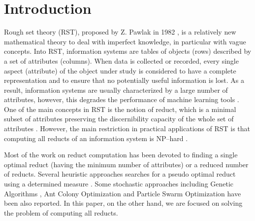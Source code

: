 \documentclass[authoryear,preprint,review,12pt]{elsarticle}
\begin{document}
\section{Introduction}
  Rough set theory (RST), proposed by Z. Pawlak in 1982 \citep{Pawlak81,Pawlak81-2,Pawlak82,Pawlak91}, 
  is a relatively new mathematical theory to deal with imperfect knowledge, in particular with vague 
  concepts. Into RST, information systems are tables of objects (rows) described by a set of attributes (columns). 
  When data is collected or recorded, every single aspect (attribute) of the object under study is considered 
  to have a complete representation and to ensure that no potentially useful information is lost.
  As a result, information systems are usually characterized by a large number of attributes,
  however, this degrades the performance of machine learning tools \citep{Parthalain08}.
  One of the main concepts in RST is the notion of reduct, which is a minimal subset of attributes 
  preserving the discernibility capacity of the whole set of attributes \citep{Pawlak91}.  
  However, the main restriction in practical applications of RST is that computing all reducts of an information 
  system is NP--hard \citep{Skowron92}. 
  
  Most of the work on reduct computation has been devoted to finding a single optimal reduct (having the minimum 
  number of attributes) or a reduced number of reducts. Several heuristic approaches searches for a pseudo optimal
  reduct using a determined measure \citep{Zheng14,Liang2014}. Some stochastic approaches including Genetic
  Algorithms \citep{Feng2012,Hedar2015}, Ant Colony Optimization \citep{Jensen03,Chebrolu2015} and Particle Swarm 
  Optimization \citep{Chen15,Luan2015} have been also reported. In this paper, on the other hand, we are focused 
  on solving the problem of computing all reducts.
  
\end{document}
